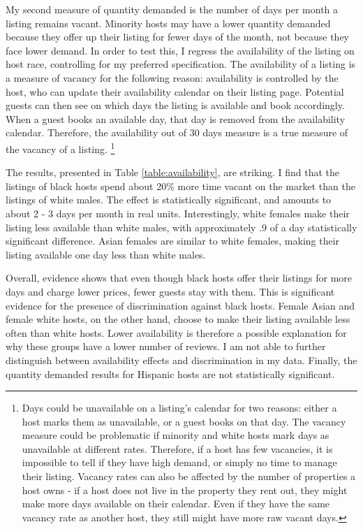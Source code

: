 
My second measure of quantity demanded is the number of days per month a listing remains vacant. Minority hosts may have a lower quantity demanded because they offer up their listing for fewer days of the month, not because they face lower demand. In order to test this, I regress the availability of the listing on host race, controlling for my preferred specification. The availability of a listing is a measure of vacancy for the following reason: availability is controlled by the host, who can update their availability calendar on their listing page. Potential guests can then see on which days the listing is available and book accordingly. When a guest books an available day, that day is removed from the availability calendar. Therefore, the availability out of 30 days measure is a true measure of the vacancy of a listing.%
	\footnote{Days could be unavailable on a listing's calendar for two reasons: either a host marks them as unavailable, or a guest books on that day. The vacancy measure could be problematic if minority and white hosts mark days as unavailable at different rates. Therefore, if a host has few vacancies, it is impossible to tell if they have high demand, or simply no time to manage their listing. Vacancy rates can also be affected by the number of properties a host owns - if a host does not live in the property they rent out, they might make more days available on their calendar. Even if they have the same vacancy rate as another host, they still might have more raw vacant days.}

The results, presented in Table \ref{table:availability}, are striking. I find that the listings of black hosts spend about 20\% more time vacant on the market than the listings of white males. The effect is statistically significant, and amounts to about 2 - 3 days per month in real units. Interestingly, white females make their listing less available than white males, with approximately .9 of a day statistically significant difference. Asian females are similar to white females, making their listing available one day less than white males. 

Overall, evidence shows that even though black hosts offer their listings for more days and charge lower prices, fewer guests stay with them. This is significant evidence for the presence of discrimination against black hosts. Female Asian and female white hosts, on the other hand, choose to make their listing available less often than white hosts. Lower availability is therefore a possible explanation for why these groups have a lower number of reviews. I am not able to further distinguish between availability effects and discrimination in my data. Finally, the quantity demanded results for Hispanic hosts are not statistically significant. 


